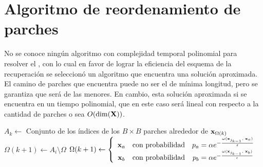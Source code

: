 \section{Algoritmo de reordenamiento de parches}

No se conoce ningún algoritmo con complejidad temporal polinomial para resolver el \TSP, con lo cual en favor de lograr la eficiencia del esquema de la recuperaci\'on se seleccion\'o un algoritmo que encuentra una soluci\'on aproximada. El camino de parches que encuentra puede no ser el de m\'inima longitud, pero se garantiza que ser\'a de las menores. En cambio, esta soluci\'on aproximada si se encuentra en un tiempo polinomial, que en este caso ser\'a lineal con respecto a la cantidad de parches o sea $O(\dim(\mathbf{X}))$.



\begin{algorithm}[h]
	\DontPrintSemicolon %
	\BlankLine
	 {
		$A_k \gets $ Conjunto de los \'indices de los $B \times B$ parches alrededor de $\mathbf{x}_{\Omega(k)}$\;
		 {
			$\Omega(k + 1) \gets A_i \setminus \Omega$\;
		}{
			$\Omega(k + 1) \gets \left\{
				\begin{array}{ccc}
				\mathbf{x}_a &\mbox{con probabilidad}& p_a = \alpha e^{-\frac{\omega(\mathbf{x}_{j_{k - 1}},\; \mathbf{x}_a)}{\epsilon}}\\
				\mathbf{x}_b &\mbox{con probabilidad}& p_b = \alpha e^{-\frac{\omega(\mathbf{x}_{j_{k - 1}},\; \mathbf{x}_b)}{\epsilon}}\\
				\end{array}
			\right.$\;
		}
	}
	\Return{$\Omega$}\;
	\caption{Reordenamiento de los parches}
	\label{al:PRA}
\end{algorithm}

